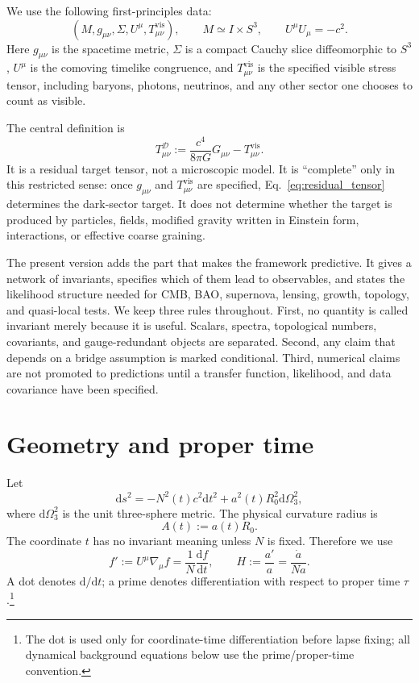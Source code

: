 \documentclass[
  aps,
  prd,
  reprint,
  superscriptaddress,
  nofootinbib,
  floatfix,
  longbibliography
]{revtex4-2}
\newcommand{\D}{\mathcal D}
\newcommand{\vis}{\mathrm{vis}}
\newcommand{\dd}{\mathrm d}
\begin{document}
We use the following first-principles data:
\begin{equation}
  (M,g_{\mu\nu},\Sigma,U^\mu,T^{\vis}_{\mu\nu}),
  \qquad
  M\simeq I\times S^3,
  \qquad
  U^\mu U_\mu=-c^2 .
  \label{eq:first_data}
\end{equation}
Here \(g_{\mu\nu}\) is the spacetime metric, \(\Sigma\) is a compact
Cauchy slice diffeomorphic to \(S^3\), \(U^\mu\) is the comoving
timelike congruence, and \(T^{\vis}_{\mu\nu}\) is the specified visible
stress tensor, including baryons, photons, neutrinos, and any other
sector one chooses to count as visible.

The central definition is
\begin{equation}
  T^\D_{\mu\nu}:=\frac{c^4}{8\pi G}G_{\mu\nu}
  -T^{\vis}_{\mu\nu}.
  \label{eq:residual_tensor}
\end{equation}
It is a residual target tensor, not a microscopic model.  It is
``complete'' only in this restricted sense: once \(g_{\mu\nu}\) and
\(T^{\vis}_{\mu\nu}\) are specified, Eq.~\eqref{eq:residual_tensor}
determines the dark-sector target.  It does not determine whether the
target is produced by particles, fields, modified gravity written in
Einstein form, interactions, or effective coarse graining.

The present version adds the part that makes the framework predictive.
It gives a network of invariants, specifies which of them lead to
observables, and states the likelihood structure needed for CMB, BAO,
supernova, lensing, growth, topology, and quasi-local tests.  We keep
three rules throughout.  First, no quantity is called invariant merely
because it is useful.  Scalars, spectra, topological numbers,
covariants, and gauge-redundant objects are separated.  Second, any
claim that depends on a bridge assumption is marked conditional.  Third,
numerical claims are not promoted to predictions until a transfer
function, likelihood, and data covariance have been specified.

\section{Geometry and proper time}
\label{sec:geometry_time}

Let
\begin{equation}
  \dd s^2=-N^2(t)c^2\dd t^2+a^2(t)R_0^2\dd\Omega_3^2 ,
  \label{eq:metric_lapse}
\end{equation}
where \(\dd\Omega_3^2\) is the unit three-sphere metric.  The physical
curvature radius is
\begin{equation}
  A(t):=a(t)R_0 .
  \label{eq:curvature_radius}
\end{equation}
The coordinate \(t\) has no invariant meaning unless \(N\) is fixed.
Therefore we use
\begin{equation}
  f' := U^\mu\nabla_\mu f=\frac1N\frac{\dd f}{\dd t},
  \qquad
  H:=\frac{a'}a=\frac{\dot a}{Na}.
  \label{eq:proper_time}
\end{equation}
A dot denotes \(\dd/\dd t\); a prime denotes differentiation with
respect to proper time \(\tau\).\footnote{The dot is used only for
coordinate-time differentiation before lapse fixing; all dynamical
background equations below use the prime/proper-time convention.}
\end{document}
